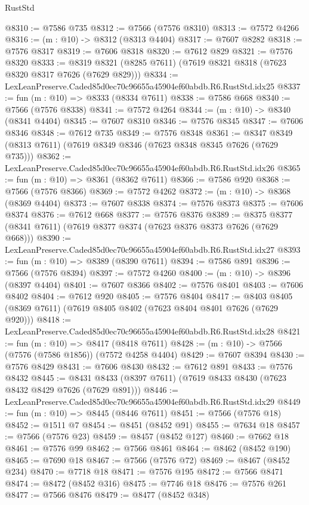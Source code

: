 \begin{lexlean}{RustStd}
\begin{coremodule}
@8310 := @7586 @735
@8312 := @7566 (@7576 @8310)
@8313 := @7572 @4266
@8316 := (m : @10) -> @8312 (@8313 @4404)
@8317 := @7607 @8282
@8318 := @7576 @8317
@8319 := @7606 @8318
@8320 := @7612 @829
@8321 := @7576 @8320
@8333 := @8319 @8321 (@8285 @7611) (@7619 @8321 @8318 (@7623 @8320 @8317 @7626 (@7629 @829)))
@8334 := LexLeanPreserve.Caded85d0ec70c96655a45904ef60abdb.R6.RustStd.idx25
@8337 := fun (m : @10) => @8333 (@8334 @7611)
@8338 := @7586 @668
@8340 := @7566 (@7576 @8338)
@8341 := @7572 @4264
@8344 := (m : @10) -> @8340 (@8341 @4404)
@8345 := @7607 @8310
@8346 := @7576 @8345
@8347 := @7606 @8346
@8348 := @7612 @735
@8349 := @7576 @8348
@8361 := @8347 @8349 (@8313 @7611) (@7619 @8349 @8346 (@7623 @8348 @8345 @7626 (@7629 @735)))
@8362 := LexLeanPreserve.Caded85d0ec70c96655a45904ef60abdb.R6.RustStd.idx26
@8365 := fun (m : @10) => @8361 (@8362 @7611)
@8366 := @7586 @920
@8368 := @7566 (@7576 @8366)
@8369 := @7572 @4262
@8372 := (m : @10) -> @8368 (@8369 @4404)
@8373 := @7607 @8338
@8374 := @7576 @8373
@8375 := @7606 @8374
@8376 := @7612 @668
@8377 := @7576 @8376
@8389 := @8375 @8377 (@8341 @7611) (@7619 @8377 @8374 (@7623 @8376 @8373 @7626 (@7629 @668)))
@8390 := LexLeanPreserve.Caded85d0ec70c96655a45904ef60abdb.R6.RustStd.idx27
@8393 := fun (m : @10) => @8389 (@8390 @7611)
@8394 := @7586 @891
@8396 := @7566 (@7576 @8394)
@8397 := @7572 @4260
@8400 := (m : @10) -> @8396 (@8397 @4404)
@8401 := @7607 @8366
@8402 := @7576 @8401
@8403 := @7606 @8402
@8404 := @7612 @920
@8405 := @7576 @8404
@8417 := @8403 @8405 (@8369 @7611) (@7619 @8405 @8402 (@7623 @8404 @8401 @7626 (@7629 @920)))
@8418 := LexLeanPreserve.Caded85d0ec70c96655a45904ef60abdb.R6.RustStd.idx28
@8421 := fun (m : @10) => @8417 (@8418 @7611)
@8428 := (m : @10) -> @7566 (@7576 (@7586 @1856)) (@7572 @4258 @4404)
@8429 := @7607 @8394
@8430 := @7576 @8429
@8431 := @7606 @8430
@8432 := @7612 @891
@8433 := @7576 @8432
@8445 := @8431 @8433 (@8397 @7611) (@7619 @8433 @8430 (@7623 @8432 @8429 @7626 (@7629 @891)))
@8446 := LexLeanPreserve.Caded85d0ec70c96655a45904ef60abdb.R6.RustStd.idx29
@8449 := fun (m : @10) => @8445 (@8446 @7611)
@8451 := @7566 (@7576 @18)
@8452 := @1511 @7
@8454 := @8451 (@8452 @91)
@8455 := @7634 @18
@8457 := @7566 (@7576 @23)
@8459 := @8457 (@8452 @127)
@8460 := @7662 @18
@8461 := @7576 @99
@8462 := @7566 @8461
@8464 := @8462 (@8452 @190)
@8465 := @7690 @18
@8467 := @7566 (@7576 @72)
@8469 := @8467 (@8452 @234)
@8470 := @7718 @18
@8471 := @7576 @195
@8472 := @7566 @8471
@8474 := @8472 (@8452 @316)
@8475 := @7746 @18
@8476 := @7576 @261
@8477 := @7566 @8476
@8479 := @8477 (@8452 @348)

\end{coremodule}
\end{lexlean}
